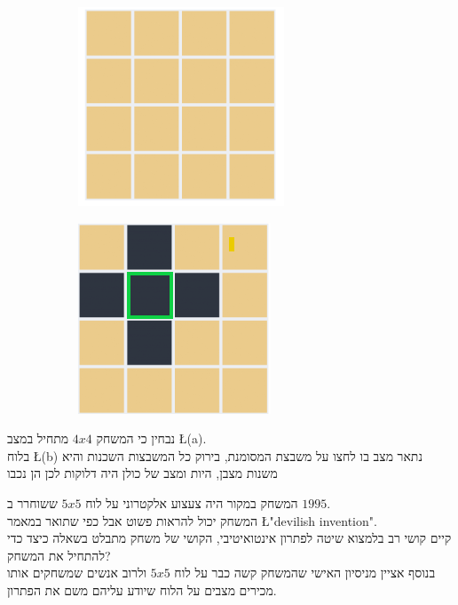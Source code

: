 \documentclass[12pt,twoside]{article}
\begin{document}
\begin{figure}[ht]
    \begin{subfigure}{.5\textwidth}
        \unsethebrew
        \caption{}
        \centering
        \includegraphics{images/4x4_start_board.PNG}
        \sethebrew
    \end{subfigure}%
    \begin{subfigure}{.5\textwidth}
        \unsethebrew
        \caption{}
        \centering
        \includegraphics{images/4x4_press.PNG}
        \sethebrew
    \end{subfigure}%
\end{figure}

נבחין כי המשחק 
$4x4$
מתחיל במצב
\L{(a)}.
\\
בלוח 
\L{(b)}
נתאר מצב בו לחצו על משבצת המסומנת, בירוק
כל המשבצות השכנות והיא משנות מצבן, היות ומצב של כולן היה דלוקות לכן הן נכבו

המשחק במקור היה צעצוע אלקטרוני על לוח 
$5x5$
ששוחרר ב 
$1995$.
\\
המשחק יכול להראות פשוט אבל כפי שתואר
במאמר
\cite{B1}
\L{"devilish invention"}.
\\
קיים קושי רב בלמצוא שיטה לפתרון אינטואיטיבי, הקושי של משחק מתבלט בשאלה כיצד כדי להתחיל את המשחק?
\\
בנוסף אציין מניסיון האישי שהמשחק קשה כבר 
על לוח 
$5x5$
ולרוב אנשים שמשחקים אותו מכירים מצבים על הלוח שיודע עליהם משם את הפתרון.
\end{document}
